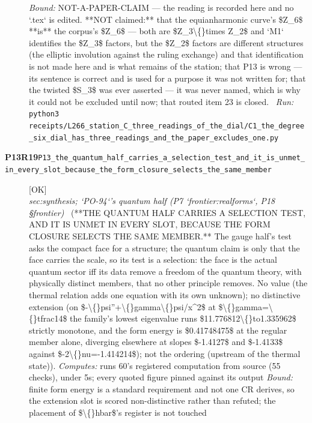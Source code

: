 \begin{description}
 \emph{Bound:} NOT-A-PAPER-CLAIM --- the reading is recorded here and no `.tex` is edited. **NOT claimed:** that the equianharmonic curve's \$Z\_6\$ **is** the corpus's \$Z\_6\$ --- both are \$Z\_3\textbackslash\{\}times Z\_2\$ and `M1` identifies the \$Z\_3\$ factors, but the \$Z\_2\$ factors are different structures (the elliptic involution against the ruling exchange) and that identification is not made here and is what remains of the station; that P13 is wrong --- its sentence is correct and is used for a purpose it was not written for; that the twisted \$S\_3\$ was ever asserted --- it was never named, which is why it could not be excluded until now; that routed item 23 is closed.
\ \emph{Run:} \texttt{python3 receipts/L266\_station\_C\_three\_readings\_of\_the\_dial/C1\_the\_degree\_six\_dial\_has\_three\_readings\_and\_the\_paper\_excludes\_one.py}
\item[\rcptlabel{P13_the_quantum_half_carries_a_selection_test_and_it_is_unmet_in_every_slot_because_the_form_closure_selects_the_same_member}{P13R19}\textbf{P13R19}\quad\texttt{P13\_the\_quantum\_half\_carries\_a\_selection\_test\_and\_it\_is\_unmet\_in\_every\_slot\_because\_the\_form\_closure\_selects\_the\_same\_member}]\hfill\textsf{[OK]}\\
\textit{sec:synthesis; `PO-94`'s quantum half (P7 `frontier:realforms`, P18 \S{}frontier)} \ (**THE QUANTUM HALF CARRIES A SELECTION TEST, AND IT IS UNMET IN EVERY SLOT, BECAUSE THE FORM CLOSURE SELECTS THE SAME MEMBER.** The gauge half's test asks the compact face for a structure; the quantum claim is only that the face carries the scale, so its test is a selection: the face is the actual quantum sector iff its data remove a freedom of the quantum theory, with physically distinct members, that no other principle removes. No value (the thermal relation adds one equation with its own unknown); no distinctive extension (on \$-\textbackslash\{\}psi''+\textbackslash\{\}gamma\textbackslash\{\}psi/x\textasciicircum{}2\$ at \$\textbackslash\{\}gamma=\textbackslash\{\}tfrac14\$ the family's lowest eigenvalue runs \$11.776812\textbackslash\{\}to1.335962\$ strictly monotone, and the form energy is \$0.41748475\$ at the regular member alone, diverging elsewhere at slopes \$-1.4127\$ and \$-1.4133\$ against \$-2\textbackslash\{\}nu=-1.414214\$); not the ordering (upstream of the thermal state)). 
\emph{Computes:} runs 60's registered computation from source (55 checks), under 5s; every quoted figure pinned against its output
 \emph{Bound:} finite form energy is a standard requirement and not one CR derives, so the extension slot is scored non-distinctive rather than refuted; the placement of \$\textbackslash\{\}hbar\$'s register is not touched

\end{description}

